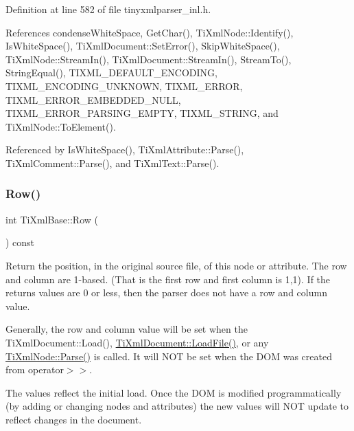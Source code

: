 Definition at line 582 of file tinyxmlparser\+\_\+inl.\+h.



References condense\+White\+Space, Get\+Char(), Ti\+Xml\+Node\+::\+Identify(), Is\+White\+Space(), Ti\+Xml\+Document\+::\+Set\+Error(), Skip\+White\+Space(), Ti\+Xml\+Node\+::\+Stream\+In(), Ti\+Xml\+Document\+::\+Stream\+In(), Stream\+To(), String\+Equal(), T\+I\+X\+M\+L\+\_\+\+D\+E\+F\+A\+U\+L\+T\+\_\+\+E\+N\+C\+O\+D\+I\+NG, T\+I\+X\+M\+L\+\_\+\+E\+N\+C\+O\+D\+I\+N\+G\+\_\+\+U\+N\+K\+N\+O\+WN, T\+I\+X\+M\+L\+\_\+\+E\+R\+R\+OR, T\+I\+X\+M\+L\+\_\+\+E\+R\+R\+O\+R\+\_\+\+E\+M\+B\+E\+D\+D\+E\+D\+\_\+\+N\+U\+LL, T\+I\+X\+M\+L\+\_\+\+E\+R\+R\+O\+R\+\_\+\+P\+A\+R\+S\+I\+N\+G\+\_\+\+E\+M\+P\+TY, T\+I\+X\+M\+L\+\_\+\+S\+T\+R\+I\+NG, and Ti\+Xml\+Node\+::\+To\+Element().



Referenced by Is\+White\+Space(), Ti\+Xml\+Attribute\+::\+Parse(), Ti\+Xml\+Comment\+::\+Parse(), and Ti\+Xml\+Text\+::\+Parse().

\hypertarget{class_ti_xml_base_ad0cacca5d76d156b26511f46080b442e}{}\label{class_ti_xml_base_ad0cacca5d76d156b26511f46080b442e} 
\subsubsection{\texorpdfstring{Row()}{Row()}}
{\footnotesize\ttfamily int Ti\+Xml\+Base\+::\+Row (\begin{DoxyParamCaption}{ }\end{DoxyParamCaption}) const\hspace{0.3cm}{\ttfamily [inline]}}

Return the position, in the original source file, of this node or attribute. The row and column are 1-\/based. (That is the first row and first column is 1,1). If the returns values are 0 or less, then the parser does not have a row and column value.

Generally, the row and column value will be set when the Ti\+Xml\+Document\+::\+Load(), \hyperlink{class_ti_xml_document_a4c852a889c02cf251117fd1d9fe1845f}{Ti\+Xml\+Document\+::\+Load\+File()}, or any \hyperlink{class_ti_xml_base_a00e4edb0219d00a1379c856e5a1d2025}{Ti\+Xml\+Node\+::\+Parse()} is called. It will N\+OT be set when the D\+OM was created from operator$>$$>$.

The values reflect the initial load. Once the D\+OM is modified programmatically (by adding or changing nodes and attributes) the new values will N\+OT update to reflect changes in the document.

